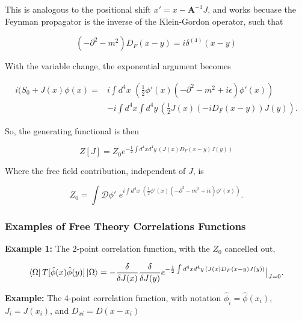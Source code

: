 \noindent This is analogous to the positional shift $x' = x - \textbf{A}^{-1} J$, and works becuase the Feynman propagator is the inverse of the Klein-Gordon operator, such that 

\begin{equation}
(-\partial^2 - m^2 ) D_F (x-y) = i \delta^{(4)} (x-y)
\end{equation}

\noindent With the variable change, the exponential argument becomes

\begin{align*}
i(S_0 + J(x) \phi (x) = & i \int d^4 x \,\, \left( \frac{1}{2} \phi' (x) (-\partial^2 -m^2 + i \epsilon) \phi' (x) \right) \\
&- i \int d^4 x \int d^4 y \, \left( \frac{1}{2} J(x) (-i D_F (x-y)) J(y) \right).
\end{align*}

\noindent So, the generating functional is then

\begin{equation}
Z[J] = Z_0 e^{-\frac{1}{2} \int d^4 x d^4 y \, ( J(x) D_F (x-y) J (y))}
\end{equation}

\noindent Where the free field contribution, independent of $J$, is

\begin{equation}
Z_0 = \int \mathcal{D} \phi' \,\, e^{ i \int d^4 x \,\, \left( \frac{1}{2} \phi' (x) (-\partial^2 -m^2 + i \epsilon) \phi' (x) \right)}.
\end{equation}

\subsubsection*{Examples of Free Theory Correlations Functions}

\noindent \textbf{Example 1:} The 2-point correlation function, with the $Z_0$ cancelled out,

\begin{equation}
\bra{\Omega} T [ \hat{\phi} (x) \hat{\phi} (y) ] \ket{\Omega} = - \frac{\delta}{\delta J(x)}  \frac{\delta}{\delta J(y)} e^{-\frac{1}{2} \int d^4 x d^4 y \, ( J(x) D_F (x-y) J (y))} \big{|}_{J=0}.
\end{equation}

\noindent \textbf{Example:} The 4-point correlation function, with notation $\hat{\phi}_i = \hat{\phi} (x_i)$, $J_i = J (x_i)$, and $D_{xi} = D(x - x_i)$


